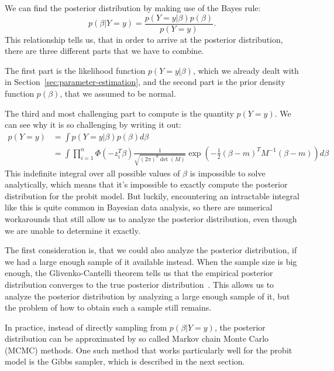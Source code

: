 We can find the posterior distribution by making use of the Bayes rule:
\begin{equation}
    p(\beta | Y=y) = \frac{p(Y=y | \beta) p(\beta)}{p(Y=y)}.
\end{equation}
This relationship tells us, that in order to arrive at the
posterior distribution, there
are three different parts that we have to combine.

The first part is the likelihood function $p(Y=y|\beta)$,
which we already dealt with in Section~\ref{sec:parameter-estimation}, and
the second part is the prior density function $p(\beta)$,
that we assumed to be normal.

The third and most challenging part to compute is the quantity $p(Y=y)$.
We can see why it is so challenging by writing it out:
\begin{equation}
    \begin{split}
        p(Y=y) &= \int p(Y=y|\beta)p(\beta) d\beta \\
        &= \int \prod_{i=1}^n \Phi(- z_i^T \beta)
        \frac{1}{\sqrt{(2\pi)^d \det(M)}}
        \exp{\left(-\frac{1}{2}(\beta - m)^T M^{-1}(\beta - m)\right)} d\beta
    \end{split}
\end{equation}
This indefinite integral over all possible values of $\beta$
is impossible to solve analytically, which means that
it's impossible to exactly compute the posterior distribution
for the probit model.
But luckily, encountering an intractable integral like this
is quite common in Bayesian data analysis, so
there are numerical workarounds that still allow us to analyze the
posterior distribution, even though we are unable
to determine it exactly.

The first consideration is, that we could also analyze the posterior
distribution, if we had a large enough sample of it available instead.
When the sample size is big enough, the Glivenko-Cantelli theorem
tells us that the empirical posterior distribution converges
to the true posterior distribution~\cite{glivenko-cantelli}.
This allows us to analyze the posterior
distribution by analyzing a large enough sample of it,
but the problem of how to obtain such a sample still remains.

In practice, instead of directly sampling from $p(\beta | Y=y)$,
the posterior distribution can be approximated by so called
Markov chain Monte Carlo (MCMC) methods.
One such method that works particularly well for the probit model
is the Gibbs sampler, which is described in the next section.

